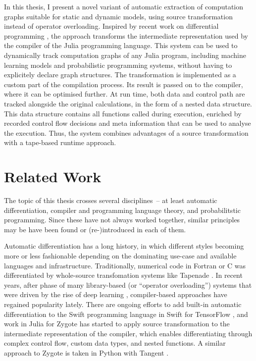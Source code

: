 In this thesis, I present a novel variant of automatic extraction of computation graphs suitable for
static and dynamic models, using source transformation instead of operator overloading.  Inspired by
recent work on differential programming \parencite{innes2018don}, the approach transforms the
intermediate representation used by the compiler of the Julia programming language.  This system can
be used to dynamically track computation graphs of any Julia program, including machine learning
models and probabilistic programming systems, without having to explicitely declare graph
structures. The transformation is implemented as a custom part of the compilation process.  Its
result is passed on to the compiler, where it can be optimised further. At run time, both data and
control path are tracked alongside the original calculations, in the form of a nested data
structure.  This data structure contains all functions called during execution, enriched by recorded
control flow decisions and meta information that can be used to analyse the execution. Thus, the
system combines advantages of a source transformation with a tape-based runtime approach.


\section{Related Work}
\label{sec:related-work}

The topic of this thesis crosses several disciplines~-- at least automatic differentiation, compiler
and programming language theory, and probabilitstic programming.  Since these have not always worked
together, similar principles may be have been found or (re-)introduced in each of them.

Automatic differentiation has a long history, in which different styles becoming more or less
fashionable depending on the dominating use-case and available languages and infrastructure.
Traditionally, numerical code in Fortran or C was differentiated by whole-source transfomation
systems like Tapenade \parencite{tapenadedevelopers2019tapenade}.  In recent years, after phase of
many library-based (or \enquote{operator overloading}) systems that were driven by the rise of deep
learning \parencite{abadi2015tensorflow,paszke2017automatic,neubig2017dynet,tokui2015chainer},
compiler-based approaches have regained popularity lately.  There are ongoing efforts to add
built-in automatic differentiation to the Swift programming language in Swift for TensorFlow
\parencite{swift2019}, and work in Julia for Zygote \parencite{innes2018don} has started to apply
source transformation to the intermediate representation of the compiler, which enables
differentiating through complex control flow, custom data types, and nested functions.  A similar
approach to Zygote is taken in Python with Tangent \parencite{vanmerrienboer2018tangent}.

